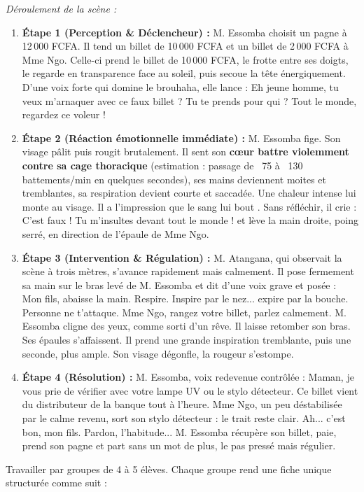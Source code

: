\documentclass[11pt]{article}
\newcounter{popsec}
\newcounter{popsub}
\newcommand{\courssub}[1]{%
  \stepcounter{popsub}%
  \par\vspace{9pt}\noindent{\popxbold\fontsize{11.5}{13}\selectfont\color{popink}{\color{poporange}\thepopsec.\thepopsub}\hspace{6pt}#1}\par\nopagebreak\vspace{4pt}
}
\begin{document}
\emph{Déroulement de la scène :}
\begin{enumerate}
    \item \textbf{Étape 1 (Perception \& Déclencheur) :} M. Essomba choisit un pagne à 12\,000 FCFA. Il tend un billet de 10\,000 FCFA et un billet de 2\,000 FCFA à Mme Ngo. Celle-ci prend le billet de 10\,000 FCFA, le frotte entre ses doigts, le regarde en transparence face au soleil, puis secoue la tête énergiquement. D'une voix forte qui domine le brouhaha, elle lance : \og Eh jeune homme, tu veux m'arnaquer avec ce faux billet ? Tu te prends pour qui ? Tout le monde, regardez ce voleur ! \fg
    \item \textbf{Étape 2 (Réaction émotionnelle immédiate) :} M. Essomba fige. Son visage pâlit puis rougit brutalement. Il sent son \textbf{cœur battre violemment contre sa cage thoracique} (estimation : passage de ~75 à ~130 battements/min en quelques secondes), ses mains deviennent moites et tremblantes, sa respiration devient courte et saccadée. Une chaleur intense lui monte au visage. Il a l'impression que \og le sang lui bout \fg. Sans réfléchir, il crie : \og C'est faux ! Tu m'insultes devant tout le monde ! \fg et lève la main droite, poing serré, en direction de l'épaule de Mme Ngo.
    \item \textbf{Étape 3 (Intervention \& Régulation) :} M. Atangana, qui observait la scène à trois mètres, s'avance rapidement mais calmement. Il pose fermement sa main sur le bras levé de M. Essomba et dit d'une voix grave et posée : \og Mon fils, abaisse la main. Respire. Inspire par le nez... expire par la bouche. Personne ne t'attaque. Mme Ngo, rangez votre billet, parlez calmement. \fg M. Essomba cligne des yeux, comme sorti d'un rêve. Il laisse retomber son bras. Ses épaules s'affaissent. Il prend une grande inspiration tremblante, puis une seconde, plus ample. Son visage dégonfle, la rougeur s'estompe.
    \item \textbf{Étape 4 (Résolution) :} M. Essomba, voix redevenue contrôlée : \og Maman, je vous prie de vérifier avec votre lampe UV ou le stylo détecteur. Ce billet vient du distributeur de la banque tout à l'heure. \fg Mme Ngo, un peu déstabilisée par le calme revenu, sort son stylo détecteur : le trait reste clair. \og Ah... c'est bon, mon fils. Pardon, l'habitude... \fg M. Essomba récupère son billet, paie, prend son pagne et part sans un mot de plus, le pas pressé mais régulier.
\end{enumerate}

\courssub{Consignes}
Travailler par groupes de 4 à 5 élèves. Chaque groupe rend une fiche unique structurée comme suit :
\end{document}
